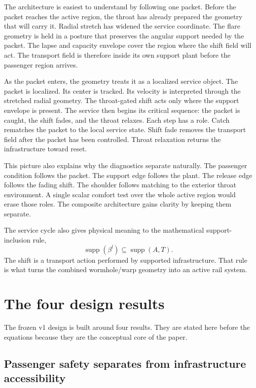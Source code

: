 \documentclass[11pt]{article}
\newcommand{\supp}{\operatorname{supp}}
\begin{document}
The architecture is easiest to understand by following one packet. Before the packet reaches the active region, the throat has already prepared the geometry that will carry it. Radial stretch has widened the service coordinate. The flare geometry is held in a posture that preserves the angular support needed by the packet. The lapse and capacity envelope cover the region where the shift field will act. The transport field is therefore inside its own support plant before the passenger region arrives.

As the packet enters, the geometry treats it as a localized service object. The packet is localized. Its center is tracked. Its velocity is interpreted through the stretched radial geometry. The throat-gated shift acts only where the support envelope is present. The service then begins its critical sequence: the packet is caught, the shift fades, and the throat relaxes. Each step has a role. Catch rematches the packet to the local service state. Shift fade removes the transport field after the packet has been controlled. Throat relaxation returns the infrastructure toward reset.

This picture also explains why the diagnostics separate naturally. The passenger condition follows the packet. The support edge follows the plant. The release edge follows the fading shift. The shoulder follows matching to the exterior throat environment. A single scalar comfort test over the whole active region would erase those roles. The composite architecture gains clarity by keeping them separate.

The service cycle also gives physical meaning to the mathematical support-inclusion rule,
\[
\supp(\beta^l)\subseteq\supp(A,T).
\]
The shift is a transport action performed by supported infrastructure. That rule is what turns the combined wormhole/warp geometry into an active rail system.

\section{The four design results}

The frozen v1 design is built around four results. They are stated here before the equations because they are the conceptual core of the paper.

\subsection{Passenger safety separates from infrastructure accessibility}
\end{document}
